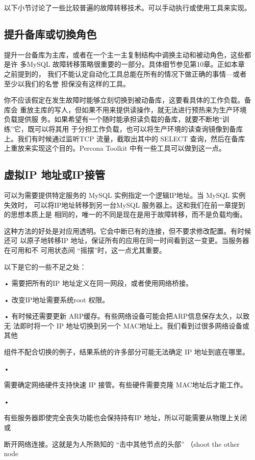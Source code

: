以下小节讨论了一些比较普遍的故障转移技术。可以手动执行或使用工具来实现。

\subsection{提升备库或切換角色}
提升一台备库为主库，或者在一个主一主复制结构中调换主动和被动角色，这些都是许
多MySQL 故障转移策略很重要的一部分。具体细节参见第10章。正如本章之前提到的，
我们不能认定自动化工具总能在所有的情况下做正确的事情—或者至少以我们的名誉
担保没有这样的工具。

你不应该假定在发生故障时能够立刻切换到被动备库，这要看具体的工作负载。备库会
重放主库的写人，但如果不用来提供读操作，就无法进行预热来为生产环境负载提供服
务。如果希望有一个随时能承担读负载的备库，就要不断地“训练”它，既可以将其用
于分担工作负载，也可以将生产环境的读查询镜像到备库上。我们有时候通过监听TCP
流量，截取出其中的 SELECT 查询，然后在备库上重放来实现这个目的。Percona Toolkit
中有一些工具可以做到这一点。

\subsection{虚拟IP 地址或IP接管}
可以为需要提供特定服务的 MySQL 实例指定一个逻辑IP地址。当 MySQL 实例失效时，
可以将IP地址转移到另一台MySQL 服务器上。这和我们在前一章提到的思想本质上是
相同的，唯一的不同是现在是用于故障转移，而不是负载均衡。

这种方法的好处是对应用透明。它会中断已有的连接，但不要求修改配置。有时候还可
以原子地转移IP 地址，保证所有的应用在同一时间看到这一变更。当服务器在可用和不
可用状态间 “摇摆”时，这一点尤其重要。

以下是它的一些不足之处：

• 需要把所有的IP 地址定义在同一网段，或者使用网络桥接。

• 改变IP地址需要系统root 权限。

• 有时候还需要更新 ARP缓存。有些网络设备可能会把ARP信息保存太久，以致无
法即时将一个 IP 地址切换到另一个 MAC地址上。我们看到过很多网络设备或其他

组件不配合切换的例子，结果系统的许多部分可能无法确定 IP 地址到底在哪里。

•

需要确定网络硬件支持快速 IP 接管。有些硬件需要克隆 MAC地址后才能工作。

•

有些服务器即使完全丧失功能也会保持持有IP 地址，所以可能需要从物理上关闭或

断开网络连接。这就是为人所熟知的 “击中其他节点的头部” （shoot the other node

